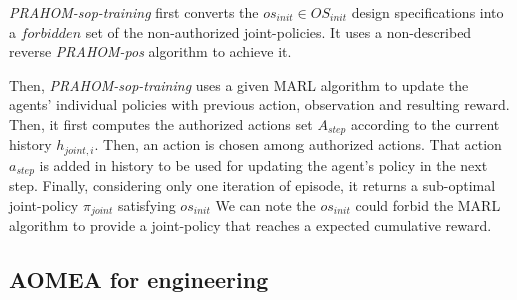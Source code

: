 \documentclass[runningheads]{llncs}
\begin{document}
\emph{PRAHOM-sop-training} first converts the $os_{init} \in OS_{init}$ design specifications into a $forbidden$ set of the non-authorized joint-policies. It uses a non-described reverse \emph{PRAHOM-pos} algorithm to achieve it.

Then, \emph{PRAHOM-sop-training} uses a given MARL algorithm to update the agents' individual policies with previous action, observation and resulting reward. Then, it first computes the authorized actions set $A_{step}$ according to the current history $h_{joint,i}$. Then, an action is chosen among authorized actions. That action $a_{step}$ is added in history to be used for updating the agent's policy in the next step.
Finally, considering only one iteration of episode, it returns a sub-optimal joint-policy $\pi_{joint}$ satisfying $os_{init}$
We can note the $os_{init}$ could forbid the MARL algorithm to provide a joint-policy that reaches a expected cumulative reward.

\subsection{AOMEA for engineering}



\end{document}
